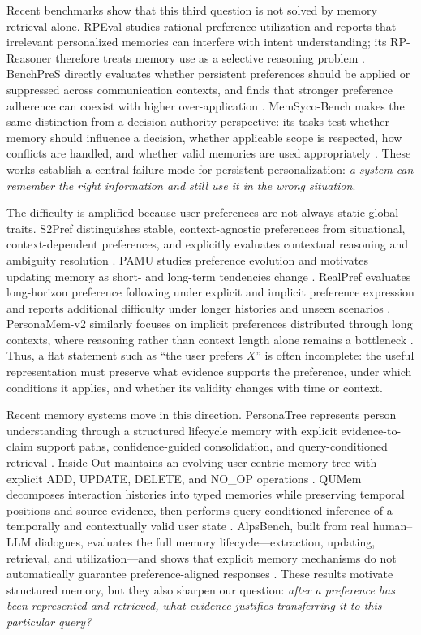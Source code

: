 \documentclass[11pt]{article}
\begin{document}
Recent benchmarks show that this third question is not solved by memory retrieval alone. RPEval studies rational preference utilization and reports that irrelevant personalized memories can interfere with intent understanding; its RP-Reasoner therefore treats memory use as a selective reasoning problem \cite{feng2026rpeval}. BenchPreS directly evaluates whether persistent preferences should be applied or suppressed across communication contexts, and finds that stronger preference adherence can coexist with higher over-application \cite{yoon2026benchpres}. MemSyco-Bench makes the same distinction from a decision-authority perspective: its tasks test whether memory should influence a decision, whether applicable scope is respected, how conflicts are handled, and whether valid memories are used appropriately \cite{xiang2026memsyco}. These works establish a central failure mode for persistent personalization: \emph{a system can remember the right information and still use it in the wrong situation}.

The difficulty is amplified because user preferences are not always static global traits. S2Pref distinguishes stable, context-agnostic preferences from situational, context-dependent preferences, and explicitly evaluates contextual reasoning and ambiguity resolution \cite{gao2026s2pref}. PAMU studies preference evolution and motivates updating memory as short- and long-term tendencies change \cite{sun2026pamu}. RealPref evaluates long-horizon preference following under explicit and implicit preference expression and reports additional difficulty under longer histories and unseen scenarios \cite{guo2026realpref}. PersonaMem-v2 similarly focuses on implicit preferences distributed through long contexts, where reasoning rather than context length alone remains a bottleneck \cite{jiang2025personamemv2}. Thus, a flat statement such as ``the user prefers $X$'' is often incomplete: the useful representation must preserve what evidence supports the preference, under which conditions it applies, and whether its validity changes with time or context.

Recent memory systems move in this direction. PersonaTree represents person understanding through a structured lifecycle memory with explicit evidence-to-claim support paths, confidence-guided consolidation, and query-conditioned retrieval \cite{hou2026personatree}. Inside Out maintains an evolving user-centric memory tree with explicit ADD, UPDATE, DELETE, and NO\_OP operations \cite{zhao2026insideout}. QUMem decomposes interaction histories into typed memories while preserving temporal positions and source evidence, then performs query-conditioned inference of a temporally and contextually valid user state \cite{wang2026qumem}. AlpsBench, built from real human--LLM dialogues, evaluates the full memory lifecycle---extraction, updating, retrieval, and utilization---and shows that explicit memory mechanisms do not automatically guarantee preference-aligned responses \cite{xiao2026alpsbench}. These results motivate structured memory, but they also sharpen our question: \emph{after a preference has been represented and retrieved, what evidence justifies transferring it to this particular query?}
\end{document}
